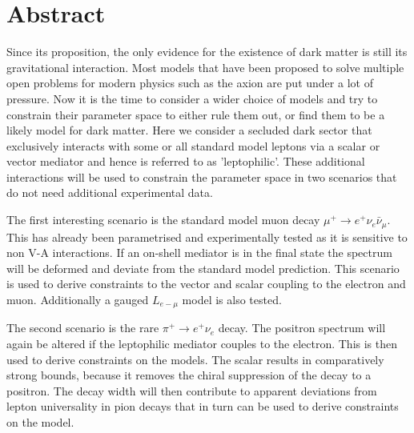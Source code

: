 \chapter*{Abstract}
Since its proposition, the only evidence for the existence of dark matter is still its gravitational interaction. Most models that have been proposed to solve multiple open problems for modern physics such as the axion are put under a lot of pressure. Now it is the time to consider a wider choice of models and try to constrain their parameter space to either rule them out, or find them to be a likely model for dark matter. Here we consider a secluded dark sector that exclusively interacts with some or all standard model leptons via a scalar or vector mediator and hence is referred to as 'leptophilic'. These additional interactions will be used to constrain the parameter space in two scenarios that do not need additional experimental data. 

The first interesting scenario is the standard model muon decay $\mu^+\rightarrow e^+\nu_e \bar{\nu}_\mu$. This has already been parametrised and experimentally tested as it is sensitive to non V-A interactions. If an on-shell mediator is in the final state the spectrum will be deformed and deviate from the standard model prediction. This scenario is used to derive constraints to the vector and scalar coupling to the electron and muon. Additionally a gauged $L_{e-\mu}$ model is also tested.

The second scenario is the rare $\pi^+\rightarrow e^+ \nu_e$ decay. The positron spectrum will again be altered if the leptophilic mediator couples to the electron. This is then used to derive constraints on the models. The scalar results in comparatively strong bounds, because it removes the chiral suppression of the decay to a positron. The decay width will then contribute to apparent deviations from lepton universality in pion decays that in turn can be used to derive constraints on the model.